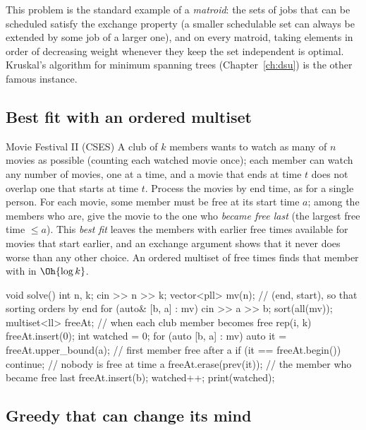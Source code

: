 This problem is the standard example of a \emph{matroid}: the sets of jobs that can be scheduled satisfy the exchange property
(a smaller schedulable set can always be extended by some job of a larger one), and on every matroid, taking elements in order
of decreasing weight whenever they keep the set independent is optimal. Kruskal's algorithm for minimum spanning trees
(Chapter~\ref{ch:dsu}) is the other famous instance.

\subsection{Best fit with an ordered multiset}

\begin{problem}{Movie Festival II (CSES)}
A club of $k$ members wants to watch as many of $n$ movies as possible (counting each watched movie once); each member can
watch any number of movies, one at a time, and a movie that ends at time $t$ does not overlap one that starts at time $t$.
\solution Process the movies by end time, as for a single person. For each movie, some member must be free at its start
time $a$; among the members who are, give the movie to the one who \emph{became free last} (the largest free time $\le a$).
This \emph{best fit} leaves the members with earlier free times available for movies that start earlier, and an exchange
argument shows that it never does worse than any other choice. An ordered multiset of free times finds that member with
 in $\Oh{\log k}$.
\end{problem}

\begin{code}
void solve() {
    int n, k;
    cin >> n >> k;
    vector<pll> mv(n);  // (end, start), so that sorting orders by end
    for (auto& [b, a] : mv) cin >> a >> b;
    sort(all(mv));
    multiset<ll> freeAt;  // when each club member becomes free
    rep(i, k) freeAt.insert(0);
    int watched = 0;
    for (auto [b, a] : mv) {
        auto it = freeAt.upper_bound(a);  // first member free after a
        if (it == freeAt.begin()) continue;  // nobody is free at time a
        freeAt.erase(prev(it));  // the member who became free last
        freeAt.insert(b);
        watched++;
    }
    print(watched);
}
\end{code}

\subsection{Greedy that can change its mind}


